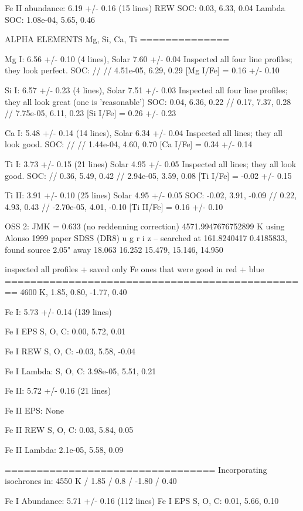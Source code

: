 \documentclass{emulateapj}
\begin{document}
Fe II abundance: 6.19 +/- 0.16 (15 lines)
REW SOC: 0.03, 6.33, 0.04
Lambda SOC: 1.08e-04, 5.65, 0.46


ALPHA ELEMENTS Mg, Si, Ca, Ti
==============


Mg I: 6.56 +/- 0.10 (4 lines), Solar 7.60 +/- 0.04
Inspected all four line profiles; they look perfect.
SOC: // // 4.51e-05, 6.29, 0.29
[Mg I/Fe] = 0.16 +/- 0.10

Si I: 6.57 +/- 0.23 (4 lines), Solar 7.51 +/- 0.03
Inspected all four line profiles; they all look great (one is 'reasonable')
SOC: 0.04, 6.36, 0.22 // 0.17, 7.37, 0.28 // 7.75e-05, 6.11, 0.23
[Si I/Fe] = 0.26 +/- 0.23

Ca I: 5.48 +/- 0.14 (14 lines), Solar 6.34 +/- 0.04
Inspected all lines; they all look good.
SOC: // // 1.44e-04, 4.60, 0.70
[Ca I/Fe] = 0.34 +/- 0.14

Ti I: 3.73 +/- 0.15 (21 lines) Solar 4.95 +/- 0.05
Inspected all lines; they all look good.
SOC: // 0.36, 5.49, 0.42 // 2.94e-05, 3.59, 0.08
[Ti I/Fe] = -0.02 +/- 0.15

Ti II: 3.91 +/- 0.10 (25 lines) Solar 4.95 +/- 0.05
SOC: -0.02, 3.91, -0.09 // 0.22, 4.93, 0.43 // -2.70e-05, 4.01, -0.10
[Ti II/Fe] = 0.16 +/- 0.10



OSS 2: JMK = 0.633 (no reddenning correction)
4571.9947676752899 K using Alonso 1999 paper
SDSS (DR8) u g r i z -- searched at 161.8240417 0.4185833, found source 2.05" away
18.063 16.252 15.479, 15.146, 14.950

inspected all profiles + saved only Fe ones that were good in red + blue
================================================
4600 K, 1.85, 0.80, -1.77, 0.40

Fe I: 5.73 +/- 0.14 (139 lines)

Fe I EPS
S, O, C: 0.00, 5.72, 0.01

Fe I REW
S, O, C: -0.03, 5.58, -0.04

Fe I Lambda:
S, O, C: 3.98e-05, 5.51, 0.21

Fe II: 5.72 +/- 0.16 (21 lines)

Fe II EPS: None

Fe II REW S, O, C: 0.03, 5.84, 0.05

Fe II Lambda: 2.1e-05, 5.58, 0.09

=================================
Incorporating isochrones in:
4550 K / 1.85 / 0.8 / -1.80 / 0.40

Fe I Abundance: 5.71 +/- 0.16 (112 lines)
Fe I EPS S, O, C: 0.01, 5.66, 0.10
\end{document}

